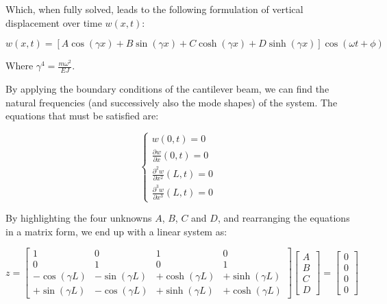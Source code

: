 Which, when fully solved, leads to the following formulation of vertical displacement over time $w(x,t)$:

\begin{equation}
    w(x,t) = \left[A\cos(\gamma x) + B\sin(\gamma x) + C\cosh(\gamma x) + D\sinh(\gamma x)\right] \cos(\omega t + \phi)
\end{equation}

Where $\gamma^4 = \frac{m \omega^2}{EJ}$.

By applying the boundary conditions of the cantilever beam, we can find the natural frequencies (and successively also the mode shapes) of the system.
The equations that must be satisfied are:

\begin{equation}
    \begin{cases}
        w(0,t) = 0                                 \\
        \frac{\partial w}{\partial x}(0,t) = 0     \\
        \frac{\partial^2 w}{\partial x^2}(L,t) = 0 \\
        \frac{\partial^3 w}{\partial x^3}(L,t) = 0
    \end{cases}
\end{equation}

By highlighting the four unknowns $A$, $B$, $C$ and $D$, and rearranging the equations in a matrix form, we end up with a linear system as:

\begin{equation}
    [H(\omega)] z
    =
    \begin{bmatrix}
        1               & 0               & 1                & 0                \\
        0               & 1               & 0                & 1                \\
        -\cos(\gamma L) & -\sin(\gamma L) & +\cosh(\gamma L) & +\sinh(\gamma L) \\
        +\sin(\gamma L) & -\cos(\gamma L) & +\sinh(\gamma L) & +\cosh(\gamma L)
    \end{bmatrix}
    \begin{bmatrix}
        A \\
        B \\
        C \\
        D
    \end{bmatrix}
    =
    \begin{bmatrix}
        0 \\
        0 \\
        0 \\
        0
    \end{bmatrix}
    \label{eq:linear_system}
\end{equation}


